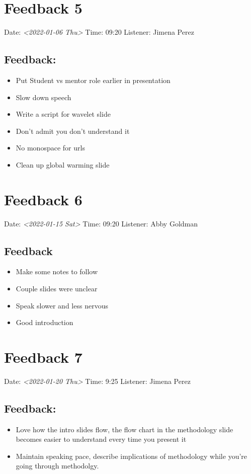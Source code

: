 \documentclass[little]{basic}
\begin{document}
\section{Feedback 5}
\label{sec:orgad8b6bb}

Date: \textit{<2022-01-06 Thu>}
Time: 09:20
Listener: Jimena Perez
\subsection*{Feedback:}
\label{sec:org3b02608}
\begin{itemize}
\item Put Student vs mentor role earlier in presentation
\item Slow down speech
\item Write a script for wavelet slide
\item Don't admit you don't understand it
\item No monospace for urls
\item Clean up global warming slide
\end{itemize}

\section{Feedback 6}
\label{sec:org068e467}

Date: \textit{<2022-01-15 Sat>}
Time: 09:20
Listener: Abby Goldman
\subsection*{Feedback}
\label{sec:org044ac2b}
\begin{itemize}
\item Make some notes to follow
\item Couple slides were unclear
\item Speak slower and less nervous
\item Good introduction
\end{itemize}

\section{Feedback 7}
\label{sec:orgba0123a}
Date: \textit{<2022-01-20 Thu>}
Time: 9:25
Listener: Jimena Perez
\subsection*{Feedback:}
\label{sec:org6749e2b}
\begin{itemize}
\item Love how the intro slides flow, the flow chart in the methodology slide becomes easier to understand every time you present it
\item Maintain speaking pace, describe implications of methodology while you're going through methodolgy.
\end{itemize}
\end{document}
